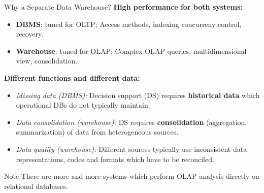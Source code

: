 \begin{frame}{Why a Separate Data Warehouse?}
	\textbf{High performance for both systems:}
	\begin{itemize}
		\item \textbf{\color{airforceblue}DBMS}: tuned for OLTP; Access methods,
		      indexing concurreny control, recovery.
		\item \textbf{\color{airforceblue}Warehouse}: tuned for OLAP; Complex OLAP
		      queries, multidimensional view, consolidation.
	\end{itemize}
	\textbf{Different functions and different data:}
	\begin{itemize}
		\item \textit{Missing data (DBMS):} Decision support (DS) requires \textbf{\color{airforceblue}historical data} which operational DBs do not typically maintain.
		\item \textit{Data consolidation (warehouse):} DS requires \textbf{\color{airforceblue}consolidation} (aggregation, summarization) of data from heterogeneous sources.
		\item \textit{Data quality (warehouse):} Different sources typically use inconsistent data representations, codes and formats which have to be reconciled.
	\end{itemize}

	\begin{alertblock}{Note}
		There are more and more systems which perform OLAP analysis directly on relational databases.
	\end{alertblock}
\end{frame}

